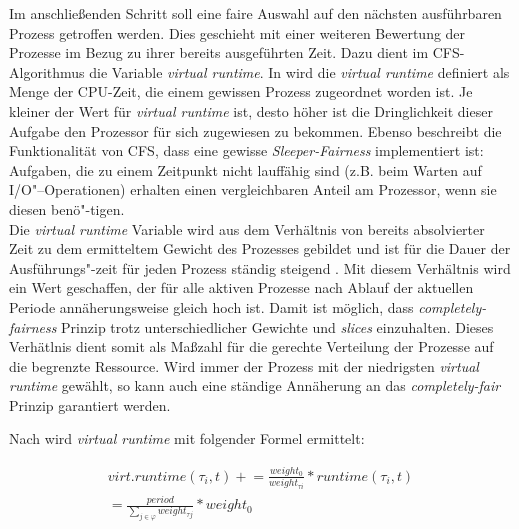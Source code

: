 Im anschließenden Schritt soll eine faire Auswahl auf den nächsten ausführbaren Prozess getroffen werden. Dies geschieht mit einer weiteren Bewertung der Prozesse im Bezug zu ihrer bereits ausgeführten Zeit. 
Dazu dient im CFS-Algorithmus die Variable \textit{virtual runtime}. In \cite{mjones} wird die \textit{virtual runtime} definiert als Menge der CPU-Zeit, die einem gewissen Prozess zugeordnet worden ist. Je kleiner der Wert für \textit{virtual runtime} ist, desto höher ist die Dringlichkeit dieser Aufgabe den Prozessor für sich zugewiesen zu bekommen. Ebenso beschreibt \cite{mjones} die Funktionalität von CFS, dass eine gewisse \textit{Sleeper-Fairness} implementiert ist: Aufgaben, die zu einem Zeitpunkt nicht lauffähig sind (z.B. beim Warten auf I/O"--Operationen) erhalten ei\-nen vergleichbaren Anteil am Prozessor, wenn sie diesen benö"-tigen.\\
Die \textit{virtual runtime} Variable wird aus dem Verhältnis von bereits absolvierter Zeit zu dem ermitteltem Gewicht des Prozesses gebildet und ist für die Dauer der Ausführungs"-zeit für jeden Prozess ständig steigend \cite{rlove}. Mit diesem Verhältnis wird ein Wert geschaffen, der für alle aktiven Prozesse nach Ablauf der aktuellen Periode annäherungs\-weise gleich hoch ist. Damit ist möglich, dass \textit{completely-fairness} Prinzip trotz unterschiedlicher Gewichte und \textit{slices} einzuhalten. Dieses Verhätlnis dient somit als Maßzahl für die gerechte Verteilung der Prozesse auf die begrenzte Ressource. Wird immer der Prozess mit der niedrigsten \textit{virtual runtime} gewählt, so kann auch eine ständige An\-nähe\-rung an das \textit{completely-fair} Prinzip garantiert werden.

Nach \cite{paperfairness} wird \textit{virtual runtime} mit folgender Formel ermittelt:

\begin{multline}
virt. runtime(\tau_{i},t) \mathrel{+}= \frac{weight_{0}}{weight_{\tau i}} * runtime(\tau_{i},t) \\ = \frac{period}{\sum_{j\in\varphi} weight_{\tau j}} * weight_{0}
\label{eq:vruntime}
\end{multline}


